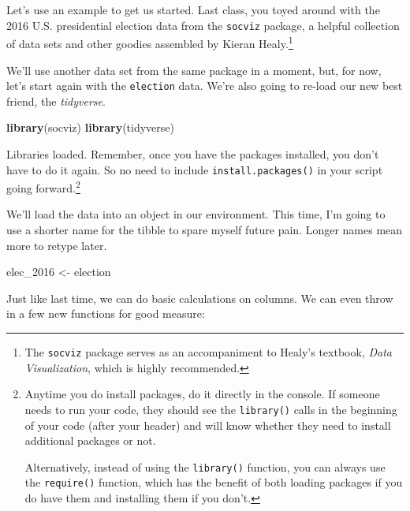 \documentclass[
]{book}
\newenvironment{Shaded}{\begin{snugshade}}{\end{snugshade}}
\newcommand{\CommentTok}[1]{\textcolor[rgb]{0.56,0.35,0.01}{\textit{#1}}}
\newcommand{\FunctionTok}[1]{\textcolor[rgb]{0.13,0.29,0.53}{\textbf{#1}}}
\newcommand{\NormalTok}[1]{#1}
\newcommand{\OtherTok}[1]{\textcolor[rgb]{0.56,0.35,0.01}{#1}}
\newcommand{\SpecialCharTok}[1]{\textcolor[rgb]{0.81,0.36,0.00}{\textbf{#1}}}
\begin{document}
Let's use an example to get us started. Last class, you toyed around with the 2016 U.S. presidential election data from the \texttt{socviz} package, a helpful collection of data sets and other goodies assembled by Kieran Healy.\footnote{The \texttt{socviz} package serves as an accompaniment to Healy's textbook, \emph{Data Visualization}, which is highly recommended.}

We'll use another data set from the same package in a moment, but, for now, let's start again with the \texttt{election} data. We're also going to re-load our new best friend, the \emph{tidyverse}.

\begin{Shaded}
\begin{Highlighting}[]
\FunctionTok{library}\NormalTok{(socviz)}
\FunctionTok{library}\NormalTok{(tidyverse)}
\end{Highlighting}
\end{Shaded}

Libraries loaded. Remember, once you have the packages installed, you don't have to do it again. So no need to include \texttt{install.packages()} in your script going forward.\footnote{Anytime you do install packages, do it directly in the console. If someone needs to run your code, they should see the \texttt{library()} calls in the beginning of your code (after your header) and will know whether they need to install additional packages or not.

  Alternatively, instead of using the \texttt{library()} function, you can always use the \texttt{require()} function, which has the benefit of both loading packages if you do have them and installing them if you don't.}

We'll load the data into an object in our environment. This time, I'm going to use a shorter name for the tibble to spare myself future pain. Longer names mean more to retype later.

\begin{Shaded}
\begin{Highlighting}[]
\NormalTok{elec\_2016 }\OtherTok{\textless{}{-}}\NormalTok{ election}
\end{Highlighting}
\end{Shaded}

Just like last time, we can do basic calculations on columns. We can even throw in a few new functions for good measure:

\begin{Shaded}
\end{Shaded}
\end{document}
